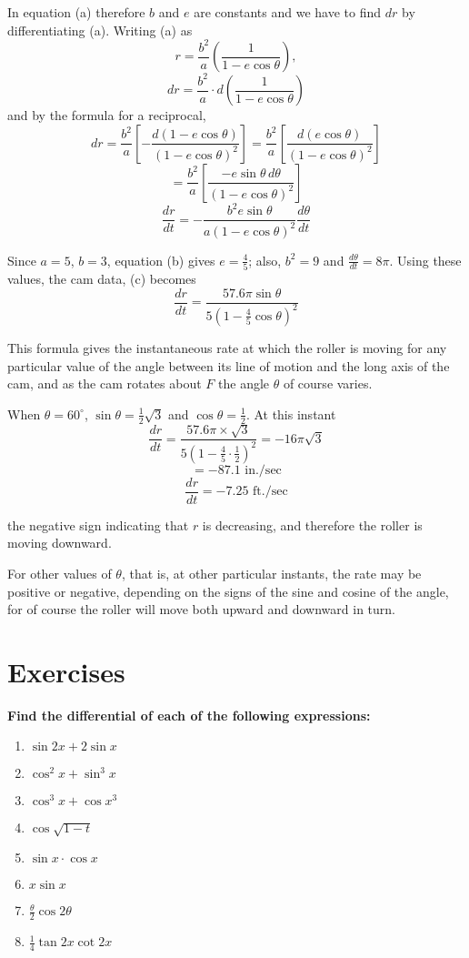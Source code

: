 In equation (a) therefore $b$ and $e$ are constants and we have to find $dr$ by differentiating (a). Writing (a) as
\[
    r = \frac{b^2}{a} \left( \frac{1}{1 - e \cos \theta} \right),
\]
\[
    dr = \frac{b^2}{a} \cdot d\left( \frac{1}{1 - e \cos \theta} \right)
\]
and by the formula for a reciprocal,
\[
    dr = \frac{b^2}{a} \left[ -\frac{d(1 - e \cos \theta)}{(1 - e \cos \theta)^2} \right]
    = \frac{b^2}{a} \left[ \frac{d(e \cos \theta)}{(1 - e \cos \theta)^2} \right]
\]
\[
    = \frac{b^2}{a} \left[ \frac{-e \sin \theta \, d\theta}{(1 - e \cos \theta)^2} \right]
\]
\[
    \frac{dr}{dt} = -\frac{b^2 e \sin \theta}{a (1 - e \cos \theta)^2} \frac{d\theta}{dt}
    \tag{c}
\]

Since $a = 5$, $b = 3$, equation (b) gives $e = \frac{4}{5}$; also, $b^2 = 9$ and $\frac{d\theta}{dt} = 8\pi$. Using these values, the cam data, (c) becomes
\[
    \frac{dr}{dt} = \frac{57.6\pi \sin\theta}{5(1 - \frac{4}{5} \cos\theta)^2}
\]

This formula gives the instantaneous rate at which the roller is moving for any particular value of the angle between its line of motion and the long axis of the cam, and as the cam rotates about $F$ the angle $\theta$ of course varies.

When $\theta = 60^\circ$, $\sin\theta = \frac{1}{2}\sqrt{3}$ and $\cos\theta = \frac{1}{2}$. At this instant
\[
    \frac{dr}{dt} = \frac{57.6\pi \times \sqrt{3}}{5(1 - \frac{4}{5} \cdot \frac{1}{2})^2}
    = -16\pi\sqrt{3}
\]
\[
    = -87.1 \text{ in./sec}
\]
\[
    \frac{dr}{dt} = -7.25 \text{ ft./sec}
\]

the negative sign indicating that $r$ is decreasing, and therefore the roller is moving downward.

For other values of $\theta$, that is, at other particular instants, the rate may be positive or negative, depending on the signs of the sine and cosine of the angle, for of course the roller will move both upward and downward in turn.

\section*{Exercises}

\textbf{Find the differential of each of the following expressions:}

\begin{enumerate}
    \item $\sin 2x + 2\sin x$
    \item $\cos^2 x + \sin^3 x$
    \item $\cos^3 x + \cos x^3$
    \item $\cos \sqrt{1-t}$
    \item $\sin x \cdot \cos x$
    \item $x\sin x$
    \item $\frac{\theta}{2} \cos 2\theta$
    \item $\frac{1}{4} \tan 2x \cot 2x$
\end{enumerate}

